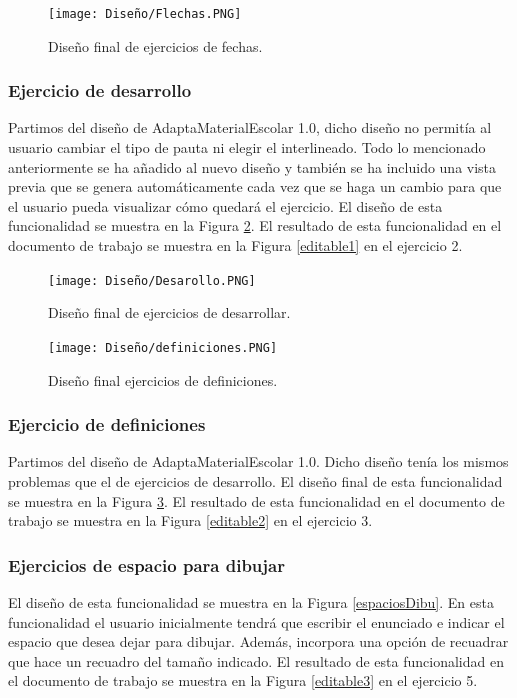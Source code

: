 \begin{figure}[ht!]
  \centering
  \texttt{[image: Diseño/Flechas.PNG]}
  \caption{Diseño final de ejercicios de fechas.}
  \label{flechas}
\end{figure}

\subsubsection{Ejercicio de desarrollo}
Partimos del diseño de AdaptaMaterialEscolar 1.0, dicho diseño no permitía al usuario cambiar el tipo de pauta ni elegir el interlineado. Todo lo mencionado anteriormente se ha añadido al nuevo diseño y también se ha incluido una vista previa que se genera automáticamente cada vez que se haga un cambio para que el usuario pueda visualizar cómo quedará el ejercicio. El diseño de esta funcionalidad se muestra en la Figura \ref{DesarrolloFinal}. El resultado de esta funcionalidad en el documento de trabajo se muestra en la Figura \ref{editable1} en el ejercicio 2.

\begin{figure}[ht!]
  \centering
  \texttt{[image: Diseño/Desarollo.PNG]}
  \caption{Diseño final de ejercicios de desarrollar.}
  \label{DesarrolloFinal}
\end{figure}

\begin{figure}[ht!]
  \centering
  \texttt{[image: Diseño/definiciones.PNG]}
  \caption{Diseño final ejercicios de definiciones.}
  \label{defi}
\end{figure}

\subsubsection{Ejercicio de definiciones}
Partimos del diseño de AdaptaMaterialEscolar 1.0. Dicho diseño tenía los mismos problemas que el de ejercicios de desarrollo. El diseño final de esta funcionalidad se muestra en la Figura \ref{defi}. El resultado de esta funcionalidad en el documento de trabajo se muestra en la Figura \ref{editable2} en el ejercicio 3.

\subsubsection{Ejercicios de espacio para dibujar}
El diseño de esta funcionalidad se muestra en la Figura \ref{espaciosDibu}. En esta funcionalidad el usuario inicialmente tendrá que escribir el enunciado e indicar el espacio que desea dejar para dibujar. Además, incorpora una opción de recuadrar que hace un recuadro del tamaño indicado. El resultado de esta funcionalidad en el documento de trabajo se muestra en la Figura \ref{editable3} en el ejercicio 5.

